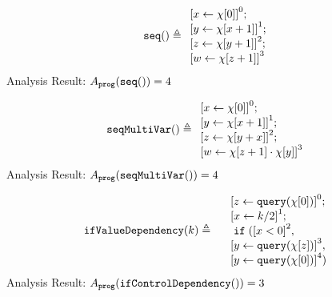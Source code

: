     \begin{example}
        \label{ex:seq}
        \[
            \kw{seq()} \triangleq 
        \begin{array}{l} 
               \clabel{ \assign{x}{\chi[0]}}^{0} ; \\
                \clabel{\assign{y}{\chi[x + 1]} }^{1} ; \\
                \clabel{\assign{z}{\chi[y + 1]}}^{2}; \\
                 \clabel{\assign{w}{\chi[z + 1]} }^{3}
            \end{array}
        \]
        Analysis Result: $ A_{\mathtt{prog}}( \mathtt{seq()}) = 4$
        \end{example}
    \begin{example}
        \label{ex:seqMultiVar}
        \[
            \kw{seqMultiVar()} \triangleq 
        \begin{array}{l} 
               \clabel{ \assign{x}{\chi[0]}}^{0} ; \\
                \clabel{\assign{y}{\chi[x + 1]} }^{1} ; \\
                \clabel{\assign{z}{\chi[y + x]}}^{2}; \\
                 \clabel{\assign{w}{\chi[z + 1] \cdot \chi[y]} }^{3}
            \end{array}
        \]
        Analysis Result: $ A_{\mathtt{prog}}(\mathtt{seqMultiVar()}) = 4$
    \end{example}
        \begin{example}
            \label{ex:ifValueDependency}
            \[
            \kw{ifValueDependency}(k) \triangleq 
            \begin{array}{l}
               \quad \clabel{ \assign{z}{\query(\chi[0])}}^{0} ; \\
               \quad \clabel{\assign{x}{k / 2} }^{1} ; \\
               \quad \eif(\clabel{x < 0}^2, \\
               \quad \clabel{\assign{y}{\query(\chi[z])}}^{3}, \\ 
               \quad \clabel{\assign{y}{\query(\chi[0])}}^{4})
                \end{array}
            \]
            Analysis Result: $ A_{\mathtt{prog}}( \mathtt{ifControlDependency()}) = 3$
        \end{example}
    
